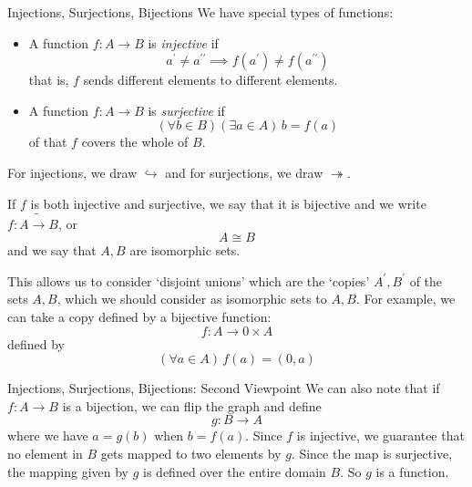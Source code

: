 \documentclass{report}
\begin{document}
\begin{definition}[\label{def:1.2.4}]{Injections, Surjections, Bijections}
    We have special types of functions:
        \begin{itemize}
            \item A function $f : A \rightarrow B$ is \textit{injective} if 
                \begin{equation*}
                    a^{\prime} \neq a^{\prime\prime} \implies f(a^{\prime}) \neq f(a^{\prime\prime})
                \end{equation*}
                that is, $f$ sends different elements to different elements.

            \item A function $f : A \rightarrow B$ is \textit{surjective} if
                \begin{equation*}
                    (\forall b \in B)(\exists a \in A) \, b = f(a)
                \end{equation*}
                of that $f$ covers the whole of $B$.
        \end{itemize}
    For injections, we draw $\hookrightarrow$ and for surjections, we draw $\twoheadrightarrow$.

    If $f$ is both injective and surjective, we say that it is bijective and we write $f : A \tilde{\rightarrow} B$, or 
        \begin{equation*}
            A \cong B
        \end{equation*}
    and we say that $A, B$ are isomorphic sets.

    This allows us to consider `disjoint unions' which are the `copies' $A^{\prime}, B^{\prime}$ of the sets $A, B$, which we should consider as isomorphic sets to $A, B$. For example, we can take a copy defined by a bijective function:
        \begin{equation*}
            f : A \rightarrow {0} \times A
        \end{equation*}
    defined by 
        \begin{equation*}
            (\forall a \in A) \, f(a) = (0, a)
        \end{equation*}
\end{definition}

\begin{definition}[\label{def:1.2.5}]{Injections, Surjections, Bijections: Second Viewpoint}
    We can also note that if $f : A \rightarrow B$ is a bijection, we can flip the graph and define
        \begin{equation*}
            g : B \rightarrow A
        \end{equation*}
    where we have $a = g(b)$ when $b = f(a)$. Since $f$ is injective, we guarantee that no element in $B$ gets mapped to two elements by $g$. Since the map is surjective, the mapping given by $g$ is defined over the entire domain $B$. So $g$ is a function. 
\end{definition}
\end{document}
